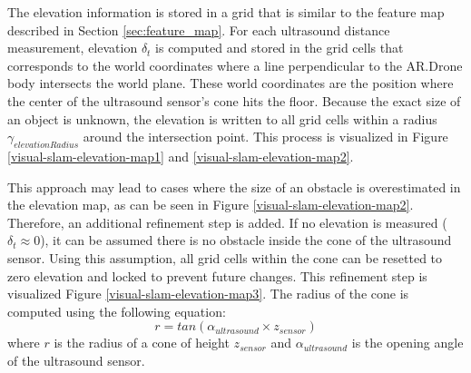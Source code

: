The elevation information is stored in a grid that is similar to the feature map described in Section \ref{sec:feature_map}.
For each ultrasound distance measurement, elevation $\delta_t$ is computed and stored in the grid cells that corresponds to the world coordinates where a line perpendicular to the AR.Drone body intersects the world plane.
These world coordinates are the position where the center of the ultrasound sensor's cone hits the floor.
Because the exact size of an object is unknown, the elevation is written to all grid cells within a radius $\gamma_{elevationRadius}$ around the intersection point.
This process is visualized in Figure \ref{visual-slam-elevation-map1} and \ref{visual-slam-elevation-map2}.

This approach may lead to cases where the size of an obstacle is overestimated in the elevation map, as can be seen in Figure \ref{visual-slam-elevation-map2}.
Therefore, an additional refinement step is added. %
If no elevation is measured ($\delta_t \approx 0$), it can be assumed there is no obstacle inside the cone of the ultrasound sensor.
Using this assumption, all grid cells within the cone can be resetted to zero elevation and locked to prevent future changes.
This refinement step is visualized Figure \ref{visual-slam-elevation-map3}.
The radius of the cone is computed using the following equation:
\begin{equation}
r = tan (\alpha_{ultrasound} \times z_{sensor})
\end{equation}
where $r$ is the radius of a cone of height $z_{sensor}$ and $\alpha_{ultrasound}$ is the opening angle of the ultrasound sensor.

